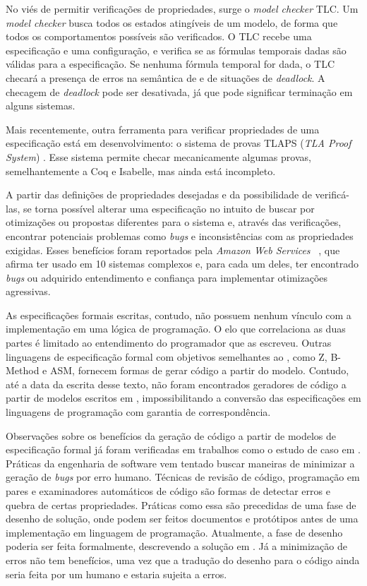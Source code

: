 No viés de permitir verificações de propriedades, surge o \textit{model checker} TLC. Um \textit{model checker} busca todos os estados atingíveis de um modelo, de forma que todos os comportamentos possíveis são verificados. O TLC recebe uma especificação e uma configuração, e verifica se as fórmulas temporais dadas são válidas para a especificação. Se nenhuma fórmula temporal for dada, o TLC checará a presença de erros na semântica de \TLA e de situações de \textit{deadlock}. A checagem de \textit{deadlock} pode ser desativada, já que pode significar terminação em alguns sistemas.

Mais recentemente, outra ferramenta para verificar propriedades de uma especificação está em desenvolvimento: o sistema de provas TLAPS (\textit{TLA Proof System}) \cite{tlaps2010}. Esse sistema permite checar mecanicamente algumas provas, semelhantemente a Coq e Isabelle, mas ainda está incompleto.

A partir das definições de propriedades desejadas e da possibilidade de verificá-las, se torna possível alterar uma especificação no intuito de buscar por otimizações ou propostas diferentes para o sistema e, através das verificações, encontrar potenciais problemas como \textit{bugs} e inconsistências com as propriedades exigidas. Esses benefícios foram reportados pela \textit{Amazon Web Services} ~\cite{amazon}, que afirma ter usado \TLA em 10 sistemas complexos e, para cada um deles, ter encontrado \textit{bugs} ou adquirido entendimento e confiança para implementar otimizações agressivas.

As especificações formais escritas, contudo, não possuem nenhum vínculo com a implementação em uma lógica de programação. O elo que correlaciona as duas partes é limitado ao entendimento do programador que as escreveu. Outras linguagens de especificação formal com objetivos semelhantes ao \TLA, como Z, B-Method e ASM, fornecem formas de gerar código a partir do modelo. Contudo, até a data da escrita desse texto, não foram encontrados geradores de código a partir de modelos escritos em \TLA, impossibilitando a conversão das especificações em linguagens de programação com garantia de correspondência.

Observações sobre os benefícios da geração de código a partir de modelos de especificação formal já foram verificadas em trabalhos como o estudo de caso em \cite{Leonard2008}. Práticas da engenharia de software vem tentado buscar maneiras de minimizar a geração de \textit{bugs} por erro humano. Técnicas de revisão de código, programação em pares e examinadores automáticos de código são formas de detectar erros e quebra de certas propriedades. Práticas como essa são precedidas de uma fase de desenho de solução, onde podem ser feitos documentos e protótipos antes de uma implementação em linguagem de programação. Atualmente, a fase de desenho poderia ser feita formalmente, descrevendo a solução em \TLA. Já a minimização de erros não tem benefícios, uma vez que a tradução do desenho para o código ainda seria feita por um humano e estaria sujeita a erros.

